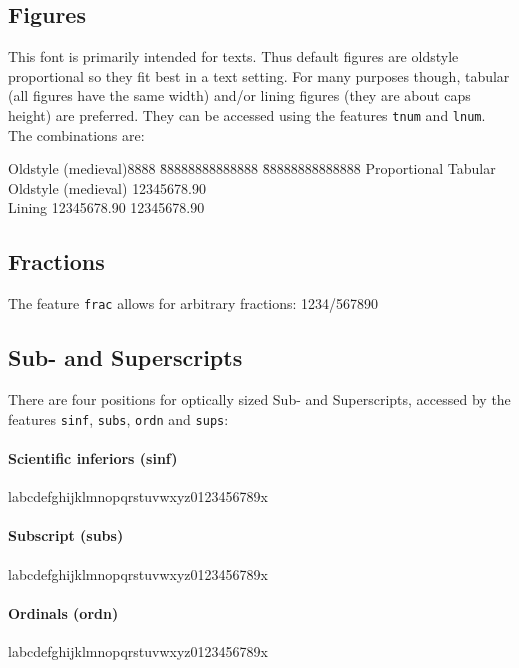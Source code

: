 \documentclass[pagesize,DIV14]{scrartcl}
\begin{document}
\subsection{Figures}
This font is primarily intended for texts. Thus default figures are oldstyle proportional so they fit best in a text setting. For many purposes though, tabular (all figures have the same width) and/or lining figures (they are about caps height) are preferred. They can be accessed using the features \texttt{tnum} and \texttt{lnum}.
The combinations are:
\begin{tabbing}
 Oldstyle (medieval)8888 \= 88888888888888  \= 88888888888888 \kill
  \> Proportional \> Tabular \\
 Oldstyle (medieval)  \> {12345678.90} \\
 Lining		\> {12345678.90} \> {12345678.90} \\
\end{tabbing}



\subsection{Fractions}
The feature \texttt{frac} allows for arbitrary fractions: { 1234/567890}

\subsection{Sub- and Superscripts}
There are four positions for optically sized Sub- and Superscripts, accessed by the features \texttt{sinf}, \texttt{subs}, \texttt{ordn} and \texttt{sups}:
\paragraph*{Scientific inferiors (sinf)} l{abcdefghijklmnopqrstuvwxyz0123456789}x
\paragraph*{Subscript (subs)} l{abcdefghijklmnopqrstuvwxyz0123456789}x
\paragraph*{Ordinals (ordn)} l{abcdefghijklmnopqrstuvwxyz0123456789}x
\end{document}
